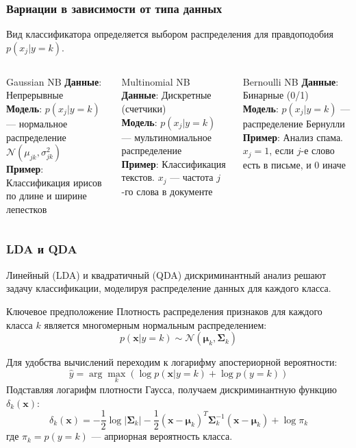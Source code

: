 \documentclass[notheorems, handout]{beamer}
\newcommand{\vect}[1]{\mathbf{#1}}
\newcommand{\matr}[1]{\boldsymbol{#1}}
\begin{document}
\begin{frame}
  \frametitle{Вариации в зависимости от типа данных}
  Вид классификатора определяется выбором распределения для правдоподобия $p(x_j|y=k)$.
  
  \begin{columns}[T]
      \begin{block}{Gaussian NB}
        \textbf{Данные}: Непрерывные\\
        \textbf{Модель}: $p(x_j|y=k)$ --- нормальное распределение $\mathcal{N}(\mu_{jk}, \sigma_{jk}^2)$\\
        \textbf{Пример}: Классификация ирисов по длине и ширине лепестков
      \end{block}
      
      \begin{block}{Multinomial NB}
        \textbf{Данные}: Дискретные (счетчики)\\
        \textbf{Модель}: $p(x_j|y=k)$ --- мультиномиальное распределение\\
        \textbf{Пример}: Классификация текстов. $x_j$ --- частота $j$-го слова в документе
      \end{block}
      
      \begin{block}{Bernoulli NB}
        \textbf{Данные}: Бинарные (0/1)\\
        \textbf{Модель}: $p(x_j|y=k)$ --- распределение Бернулли\\
        \textbf{Пример}: Анализ спама. $x_j=1$, если $j$-е слово есть в письме, и $0$ иначе
      \end{block}
  \end{columns}
\end{frame}

\begin{frame}
    \frametitle{LDA и QDA}
    Линейный (LDA) и квадратичный (QDA) дискриминантный анализ  решают задачу классификации, моделируя распределение данных для каждого класса.
    \begin{block}{Ключевое предположение}
     Плотность распределения признаков для каждого класса $k$ является многомерным нормальным распределением:
     $$ p(\vect{x}|y=k) \sim \mathcal{N}(\matr{\mu}_k, \matr{\Sigma}_k) $$
    \end{block}
    Для удобства вычислений переходим к логарифму апостериорной вероятности:
    $$ \hat{y} = \arg\max_k \left( \log p(\vect{x}|y=k) + \log p(y=k) \right) $$
    Подставляя логарифм плотности Гаусса, получаем дискриминантную функцию $\delta_k(\vect{x})$:
    $$ \delta_k(\vect{x}) = -\frac{1}{2}\log|\matr{\Sigma}_k| - \frac{1}{2}(\vect{x}-\matr{\mu}_k)^T\matr{\Sigma}_k^{-1}(\vect{x}-\matr{\mu}_k) + \log \pi_k $$
    где $\pi_k = p(y=k)$ --- априорная вероятность класса.
\end{frame}
\end{document}
